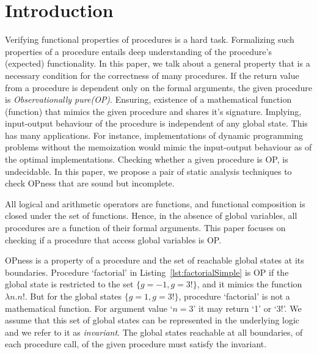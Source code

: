 \documentclass{llncs}
\begin{document}
\section{Introduction}
Verifying functional properties of procedures is a hard task. 
Formalizing such properties of a procedure entails
deep understanding of the procedure's (expected) functionality.
In this paper, we talk about a general property that is a necessary
condition for the correctness of many procedures. If the return value
from a procedure is dependent only on the formal arguments, the given
procedure is \textit{Observationally pure(OP)}.
Ensuring, existence of a mathematical function (function) that mimics
the given procedure and shares it's signature. Implying, input-output
behaviour of the procedure is independent of any global state. This
has many applications.  For instance, implementations of dynamic
programming problems without the memoization would mimic the
input-output behaviour as of the optimal implementations. Checking
whether a given procedure is OP, is undecidable. In this paper, we
propose a pair of static analysis techniques to check OPness that are
sound but incomplete.

All logical and arithmetic operators are functions, and functional
composition is closed under the set of functions.
Hence, in the absence of global variables, all procedures
are a function of their formal arguments. This paper focuses on
checking if a procedure that access global variables is OP.

OPness is a property of a procedure and the set of reachable global
states at its boundaries. Procedure `factorial' in
Listing~\ref{lst:factorialSimple} is OP if the global state is
restricted to the set $\{g = -1, g = 3!\}$, and it mimics the function
$\lambda n.n!$. But for the global states $\{g = 1, g = 3!\}$,
procedure `factorial' is not a mathematical function. For argument
value `$n = 3$' it may return `1' or `3!'.  We assume that this set of
global states can be represented in the underlying logic and we refer
to it as \textit{invariant}.  The global states reachable at all
boundaries, of each procedure call, of the given procedure must
satisfy the invariant.
\end{document}
